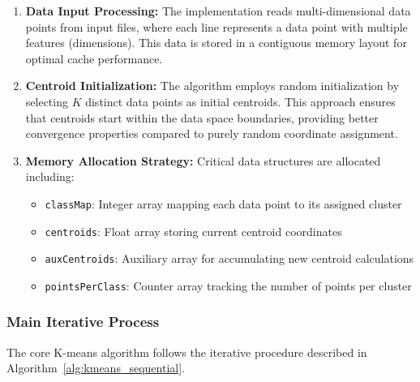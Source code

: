 \documentclass[12pt,a4paper]{article}
\begin{document}
\begin{enumerate}
\item \textbf{Data Input Processing:} The implementation reads multi-dimensional data points from input files, where each line represents a data point with multiple features (dimensions). This data is stored in a contiguous memory layout for optimal cache performance.

\item \textbf{Centroid Initialization:} The algorithm employs random initialization by selecting $K$ distinct data points as initial centroids. This approach ensures that centroids start within the data space boundaries, providing better convergence properties compared to purely random coordinate assignment.

\item \textbf{Memory Allocation Strategy:} Critical data structures are allocated including:
\begin{itemize}
    \item \texttt{classMap}: Integer array mapping each data point to its assigned cluster
    \item \texttt{centroids}: Float array storing current centroid coordinates
    \item \texttt{auxCentroids}: Auxiliary array for accumulating new centroid calculations
    \item \texttt{pointsPerClass}: Counter array tracking the number of points per cluster
\end{itemize}
\end{enumerate}

\subsubsection{Main Iterative Process}

The core K-means algorithm follows the iterative procedure described in Algorithm~\ref{alg:kmeans_sequential}.
\end{document}
